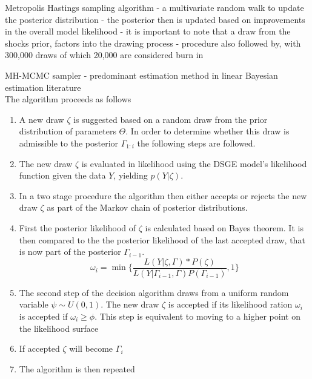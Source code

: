 \documentclass[11pt,a4paper,english]{article} %
\begin{document}
	
	Metropolis Hastings sampling algorithm
	- a multivariate random walk to update the posterior distribution
	- the posterior then is updated based on improvements in the overall model likelihood
	- it is important to note that a draw from the shocks prior, factors into the drawing process
	- procedure also followed by, with 300,000 draws of which 20,000 are considered burn in \cite{chin_bayesian_2019}
	
	MH-MCMC sampler
	- predominant estimation method in linear Bayesian estimation literature \cite{guerron-quintana_bayesian_2013}\\
	
	
	The algorithm proceeds as follows \cite{herbst_bayesian_2014}\\
	
	\begin{enumerate}
		\item A new draw $\zeta$ is suggested based on a random draw from the prior distribution of parameters $\Theta$. In order to determine whether this draw is admissible to the posterior $\Gamma_{1:i}$ the following steps are followed.
		
		\item The new draw $\zeta$ is evaluated in likelihood using the DSGE model's likelihood function given the data $Y$, yielding $p(Y | \zeta)$. 
				
		\item In a two stage procedure the algorithm then either accepts or rejects the new draw $\zeta$ as part of the Markov chain of posterior distributions. 
		
		\item First the posterior likelihood of $\zeta$ is calculated based on Bayes theorem. It is then compared to the the posterior likelihood of the last accepted draw, that is now part of the posterior $\Gamma_{i-1}$. 
		\[
			\omega_i = \min \{\frac{L(Y| \zeta, \Gamma) * P(\zeta)}{L(Y| \Gamma_{i-1}, \Gamma) P(\Gamma_{i-1})}, 1 \}
		\]

		\item The second step of the decision algorithm draws from a uniform random variable $\psi \sim U(0, 1)$. The new draw $\zeta$ is accepted if its likelihood ration $\omega_i$ is accepted if $\omega_i \geq \phi$. This step is equivalent to moving to a higher point on the likelihood surface \cite{herbst_bayesian_2014}
		
		\item If accepted $\zeta$ will become $\Gamma_i$
		
		\item The algorithm is then repeated
		
	\end{enumerate}
\end{document}
